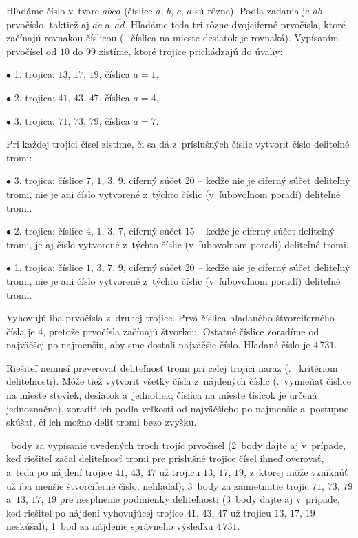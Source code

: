 {%
Hľadáme číslo v~tvare $\overline{abcd}$ (číslice $a$, $b$, $c$, $d$ sú rôzne).
Podľa zadania je $\overline{ab}$ prvočíslo, taktiež aj $\overline{ac}$
a~$\overline{ad}$.
Hľadáme teda tri rôzne dvojciferné prvočísla, ktoré začínajú rovnakou číslicou
(\tj.~číslica na mieste desiatok je rovnaká).
Vypísaním prvočísel od $10$ do $99$ zistíme, ktoré trojice prichádzajú do úvahy:
\item{$\bullet$} 1. trojica: $13$, $17$, $19$, číslica $a=1$,
\item{$\bullet$} 2. trojica: $41$, $43$, $47$, číslica $a=4$,
\item{$\bullet$} 3. trojica: $71$, $73$, $79$, číslica $a=7$.

Pri každej trojici čísel zistíme, či sa dá z~príslušných číslic vytvoriť číslo
deliteľné tromi:
  \item{$\bullet$} 3. trojica: číslice $7$, $1$, $3$, $9$, ciferný súčet $20$
    -- keďže nie je ciferný súčet deliteľný tromi, nie je ani číslo
    vytvorené z~týchto číslic (v~ľubovoľnom poradí) deliteľné tromi.
  \item{$\bullet$} 2. trojica: číslice $4$, $1$, $3$, $7$, ciferný súčet $15$
    -- keďže je ciferný súčet deliteľný tromi, je aj číslo vytvorené
    z~týchto číslic (v~ľubovoľnom poradí) deliteľné tromi.
  \item{$\bullet$} 1. trojica: číslice $1$, $3$, $7$, $9$, ciferný súčet $20$
    -- keďže nie je ciferný súčet deliteľný tromi, nie je ani číslo
    vytvorené z~týchto číslic (v~ľubovoľnom poradí) deliteľné tromi.

Vyhovujú iba prvočísla z~druhej trojice.
Prvá číslica hľadaného štvorciferného čísla je $4$, pretože prvočísla začínajú štvorkou.
Ostatné číslice zoradíme od najväčšej po najmenšiu, aby sme dostali najväčšie číslo.
Hľadané číslo je $4\,731$.

\poznamka %
Riešiteľ nemusí preverovať deliteľnosť tromi pri celej trojici naraz (\tj.~
kritériom deliteľnosti).
Môže tiež vytvoriť všetky čísla z~nájdených číslic (\tj.~vymieňať číslice
na mieste stoviek, desiatok a~jednotiek; číslica na mieste tisícok je určená
jednoznačne), zoradiť ich podľa veľkosti od najväčšieho po najmenšie
a~postupne skúšať, či ich možno deliť tromi bezo zvyšku.

~body za vypísanie uvedených troch trojíc prvočísel
(2~body dajte aj v~prípade, keď riešiteľ začal deliteľnosť tromi pre
príslušné trojice čísel ihneď overovať, a~teda po nájdení trojice $41$, $43$,
$47$ už trojicu $13$, $17$, $19$, z~ktorej môže vzniknúť už iba menšie štvorciferné číslo, nehľadal);
3~body za zamietnutie trojíc $71$, $73$, $79$ a~$13$, $17$, $19$ pre nesplnenie podmienky deliteľnosti
(3~body dajte aj v~prípade, keď riešiteľ po nájdení vyhovujúcej trojice $41$, $43$, $47$ už trojicu $13$, $17$, $19$ neskúšal);
1~bod za nájdenie správneho výsledku $4\,731$.
\endhodnotenie
}


